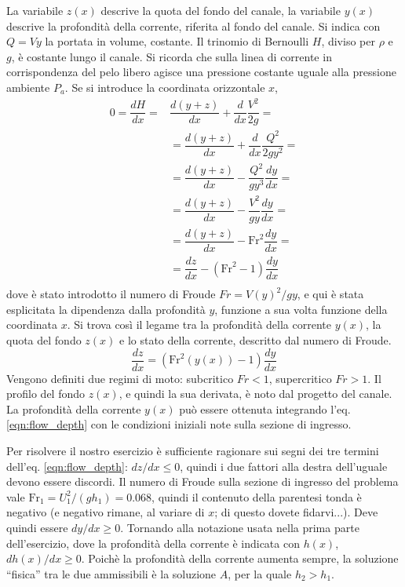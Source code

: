 La variabile
 $z(x)$ descrive la quota del fondo del canale, la variabile $y(x)$ descrive
 la profondità della corrente, riferita al fondo del canale. Si indica
 con $Q = V y $ la portata in volume, costante.
Il trinomio di Bernoulli $H$, diviso per $\rho$ e $g$, è costante lungo il
 canale. Si ricorda che sulla linea di corrente in corrispondenza del pelo
 libero agisce una pressione costante uguale alla pressione ambiente $P_a$.
Se si introduce la coordinata orizzontale $x$,
\begin{equation}
\begin{aligned}
 0 = \dfrac{d H}{d x} = 
 & \dfrac{d (y+z)}{d x} + \dfrac{d}{d x} \dfrac{V^2}{2 g}     = \\
 & = \dfrac{d (y+z)}{d x} + \dfrac{d}{d x} \dfrac{Q^2}{2 g y^2} = \\
 & = \dfrac{d (y+z)}{d x} - \dfrac{Q^2}{g y^3} \dfrac{d y}{d x} = \\
 & = \dfrac{d (y+z)}{d x} - \dfrac{V^2}{g y} \dfrac{d y}{d x} = \\ 
 & = \dfrac{d (y+z)}{d x} - \text{Fr}^2 \dfrac{d y}{d x} = \\ 
 & = \dfrac{d z}{d x} - (\text{Fr}^2 - 1) \dfrac{d y}{d x} \\ 
\end{aligned}
\end{equation}
dove è stato introdotto il numero di Froude $\textit{Fr} = V(y)^2 / g y$, e
 qui è stata esplicitata la dipendenza dalla profondità $y$, funzione a sua
 volta funzione della coordinata $x$.
Si trova così il legame tra la profondità della corrente $y(x)$, la quota
 del fondo $z(x)$ e lo stato della corrente, descritto dal numero di Froude.
\begin{equation}\label{eqn:flow_depth}
 \dfrac{d z}{d x} = (\text{Fr}^2(y(x)) - 1) \dfrac{d y}{d x}
\end{equation}
Vengono definiti due regimi di moto: subcritico $\textit{Fr} < 1$,
 supercritico $\textit{Fr} > 1$. Il profilo del fondo $z(x)$,
 e quindi la sua derivata, è noto dal progetto del canale.
 La profondità della corrente $y(x)$ può essere ottenuta integrando l'eq.
 \ref{eqn:flow_depth} con le condizioni iniziali note sulla sezione di 
 ingresso.

Per risolvere il nostro esercizio è sufficiente ragionare sui segni dei tre
 termini dell'eq. \ref{eqn:flow_depth}: $dz/dx \le 0$, quindi i due fattori
 alla destra dell'uguale devono essere discordi.
Il numero di Froude sulla sezione di ingresso del problema vale
 $\text{Fr}_1 = U^2_1 / (g h_1) = 0.068$, quindi il contenuto della parentesi
 tonda è negativo (e negativo rimane, al variare di $x$; di questo dovete
 fidarvi...).
 Deve quindi essere $dy/dx \ge 0$. Tornando alla notazione usata nella prima
 parte dell'esercizio, dove la profondità della corrente è indicata con
 $h(x)$, $dh(x)/dx \ge 0$. Poichè la profondità della corrente aumenta
 sempre, la soluzione ``fisica'' tra le due ammissibili è la soluzione $A$,
 per la quale $h_2 > h_1$.

